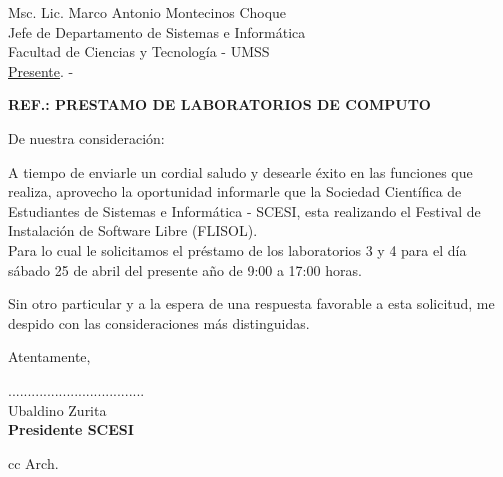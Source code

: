 \documentclass[letterpaper,12pt]{letter}
\begin{document}
\date{\today}
\begin{letter}{Msc. Lic. Marco Antonio Montecinos Choque \\ Jefe de Departamento de Sistemas e Informática \\ Facultad de Ciencias y Tecnolog\'ia - UMSS \\ \underline {Presente}. -}


\begin{center}
	\opening{\textbf{REF.: PRESTAMO DE LABORATORIOS DE COMPUTO}}
\end{center}

De nuestra consideración:

A tiempo de enviarle un cordial saludo y desearle éxito en las funciones que realiza, aprovecho la oportunidad informarle que la Sociedad Cient\'ifica de Estudiantes de Sistemas e Inform\'atica - SCESI, esta realizando el Festival de Instalación de Software Libre (FLISOL).\\

Para lo cual le solicitamos el préstamo de los laboratorios 3 y 4 para el día sábado 25 de abril del presente año de 9:00 a 17:00 horas.

Sin otro particular y a la espera de una respuesta favorable a esta solicitud, me despido con las 
consideraciones más distinguidas.

Atentamente,

\vspace{2.5cm}

\begin{center}
...................................\\
Ubaldino Zurita\\
{\bfseries Presidente SCESI}
\end{center}
\vspace{1cm}
cc Arch.
\end{letter}
\end{document}
